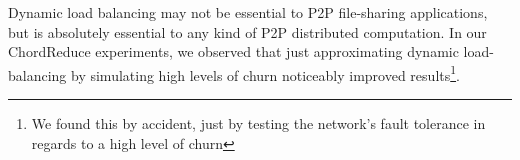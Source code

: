 Dynamic load balancing may not be essential to P2P file-sharing applications, but is absolutely essential to any kind of P2P distributed computation.
In our ChordReduce experiments, we observed that just approximating dynamic load-balancing by simulating high levels of churn noticeably improved results\footnote{We found this by accident, just by testing the network's fault tolerance in regards to a high level of churn}.








